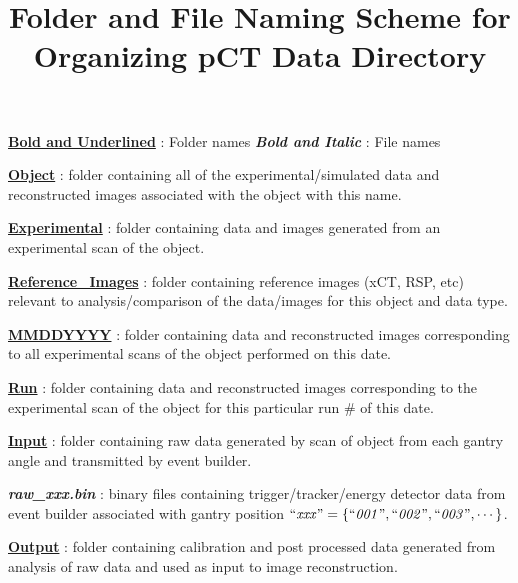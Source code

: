 \documentclass{article}
\title{\vspace{-4ex}Folder and File Naming Scheme for Organizing pCT Data Directory}
\date{\vspace{-5ex}}
\begin{document}
\maketitle
\flushleft\ul{\textbf{Bold and Underlined}} : Folder names
\flushleft\textbf{\textit{Bold and Italic}} : File names
\begin{myEnumerate}[labelindent=0pt, leftmargin=*]
    \item \ul{\textbf{Object}} : folder containing all of the experimental/simulated data and reconstructed images associated with the object with this name.
    \begin{myEnumerate}[labelindent=1pt, leftmargin=*]
        \item \ul{\textbf{Experimental}} : folder containing data and images generated from an experimental scan of the object.
        \begin{myEnumerate}[labelindent=1pt, leftmargin=*]
            \item \ul{\textbf{Reference\_Images}} : folder containing reference images (xCT, RSP, etc) relevant to analysis/comparison of the data/images for this object and data type.
            \item \ul{\textbf{MMDDYYYY}} : folder containing data and reconstructed images corresponding to all experimental scans of the object performed on this date.
            \begin{myEnumerate}[labelindent=1pt, leftmargin=*]
                \item \ul{\textbf{Run}} : folder containing data and reconstructed images corresponding to the experimental scan of the object for this particular run \# of this date.
                \begin{myEnumerate}[labelindent=1pt, leftmargin=*]
                    \item \ul{\textbf{Input}} : folder containing raw data generated by scan of object from each gantry angle and transmitted by event builder.
                    \begin{myEnumerate}[labelindent=1pt, leftmargin=*]
                        \item \textbf{\textit{raw\_xxx.bin}} : binary files containing trigger/tracker/energy detector data from event builder associated with gantry position $\textrm{``\textit{xxx}''} =\{\textrm{``\textit{001}''}, \textrm{``\textit{002}''}, \textrm{``\textit{003}''}, \cdots\}$.
                    \end{myEnumerate}
                    \item \ul{\textbf{Output}} : folder containing calibration and post processed data generated from analysis of raw data and used as input to image reconstruction.

\end{myEnumerate}
\end{myEnumerate}
\end{myEnumerate}
\end{myEnumerate}
\end{myEnumerate}
\end{document}
